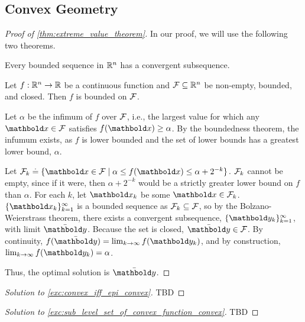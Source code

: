 \section{}

\subsection{Convex Geometry}

\begin{proof}[Proof of \cref{thm:extreme_value_theorem}] In our proof, we will use the following two theorems.
\begin{fct} Every bounded sequence in $\mathbb{R}^n$ has a convergent subsequence.
\end{fct}
\begin{fct}
Let $f : \mathbb{R}^n \to \mathbb{R}$ be a continuous function and $\mathcal{F} \subseteq \mathbb{R}^n$ be non-empty, bounded, and closed. Then $f$ is bounded on $\mathcal{F}$.
\end{fct}

Let $\alpha$ be the infimum of $f$ over $\mathcal{F}$, i.e., the largest value for which any $\vx \in \spa{F}$ satisfies $f(\vx) \geq \alpha$. By the boundedness theorem, the infumum exists, as $f$ is lower bounded and the set of lower bounds has a greatest lower bound, $\alpha$.

Let $\spa{F}_k \defeq \{\vx \in \spa{F} \mid \alpha \leq f(\vx) \leq \alpha + 2^{-k}\}$. $\mathcal{F}_k$ cannot be empty, since if it were, then $\alpha + 2^{-k}$ would be a strictly greater lower bound on $f$ than $\alpha$. For each $k$, let $\vx_k$ be some $\vx \in \spa{F}_k$. $\{\vx_k\}_{k=1}^\infty$ is a bounded sequence as $\mathcal{F}_k \subseteq \mathcal{F}$, so by the Bolzano-Weierstrass theorem, there exists a convergent subsequence, $\{\vy_k\}_{k=1}^\infty$, with limit $\Bar{\vy}$. Because the set is closed, $\Bar{\vy} \in \spa{F}$. By continuity, $f(\Bar{\vy}) = \lim_{k\to\infty} f(\vy_k)$, and by construction, $\lim_{k\to\infty} f(\vy_k) = \alpha$.

Thus, the optimal solution is $\Bar{\vy}$.
\end{proof}

\begin{proof}[Solution to \cref{exc:convex_iff_epi_convex}] TBD
\end{proof}

\begin{proof}[Solution to \cref{exc:sub_level_set_of_convex_function_convex}] TBD
\end{proof}

